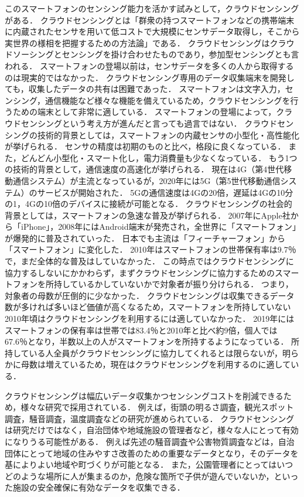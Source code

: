このスマートフォンのセンシング能力を活かす試みとして，クラウドセンシングがある．
クラウドセンシングとは「群衆の持つスマートフォンなどの携帯端末に内蔵されたセンサを用いて低コストで大規模にセンサデータ取得し，そこから実世界の様相を把握するための方法論\cite{weko}」である．
クラウドセンシングはクラウドソーシングとセンシングを掛け合わせたものであり，参加型センシングとも言われる．
スマートフォンの登場以前は，センサデータを多くの人から取得するのは現実的ではなかった．
クラウドセンシング専用のデータ収集端末を開発しても，収集したデータの共有は困難であった．
スマートフォンは文字入力，センシング，通信機能など様々な機能を備えているため，クラウドセンシングを行うための端末として非常に適している．
スマートフォンの登場によって，クラウドセンシングという考え方が進んだと言っても過言ではない．
クラウドセンシングの技術的背景としては，スマートフォンの内蔵センサの小型化・高性能化が挙げられる．
センサの精度は初期のものと比べ，格段に良くなっている．
また，どんどん小型化・スマート化し，電力消費量も少なくなっている．
もう1つの技術的背景として，通信速度の高速化が挙げられる．
現在は4G（第4世代移動通信システム）が主流となっているが，2020年には5G（第5世代移動通信システム）のサービスが開始された．
5Gの通信速度は4Gの20倍，遅延は4Gの10分の1，4Gの10倍のデバイスに接続が可能となる\cite{5G4G}．
クラウドセンシングの社会的背景としては，スマートフォンの急速な普及が挙げられる．
2007年にApple社から「iPhone」，2008年にはAndroid端末が発売され，全世界に「スマートフォン」が爆発的に普及されていった．
日本でも主流は「フィーチャーフォン」から「スマートフォン」に変化した．
2010年はスマートフォンの世帯保有率は9.7％\cite{soumu}で，まだ全体的な普及はしていなかった．
この時点ではクラウドセンシングに協力するしないにかかわらず，まずクラウドセンシングに協力するためのスマートフォンを所持しているかしていないかで対象者が振り分けられる．
つまり，対象者の母数が圧倒的に少なかった．
クラウドセンシングは収集できるデータ数が多ければ多いほど価値が高くなるため，スマートフォンを所持していない2010年頃はクラウドセンシングを利用するには適していなかった．
2019年にはスマートフォンの保有率は世帯では83.4％と2010年と比べ約9倍，個人では67.6％\cite{soumu}となり，半数以上の人がスマートフォンを所持するようになっている．
所持している人全員がクラウドセンシングに協力してくれるとは限らないが，明らかに母数は増えているため，現在はクラウドセンシングを利用するのに適している．

クラウドセンシングは幅広いデータ収集かつセンシングコストを削減できるため，様々な研究で採用されている．
例えば，街頭の明るさ調査，観光スポット調査，騒音調査，温度調査などの研究が進められている\cite{liu}．
クラウドセンシングは研究だけではなく，自治団体や地域施設の管理者など，様々な人にとって有効になりうる可能性がある．
例えば先述の騒音調査や公害物質調査などは，自治団体にとって地域の住みやすさ改善のための重要なデータとなり，そのデータを基によりよい地域や町づくりが可能となる．
また，公園管理者にとってはいつどのような場所に人が集まるのか，危険な箇所で子供が遊んでいないか，といった施設の安全確保に有効なデータを収集できる．

